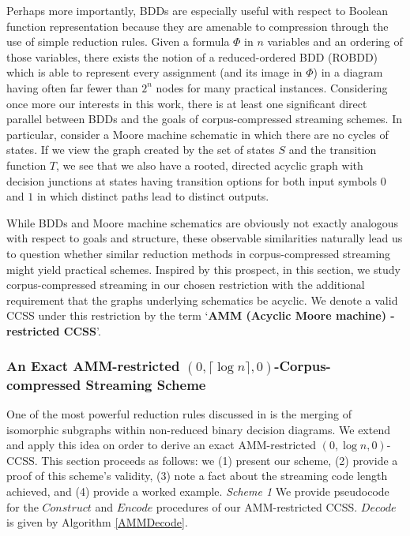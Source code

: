\documentclass{article}
\theoremstyle{definition}
\begin{document}
Perhaps more importantly, BDDs are especially useful with respect to Boolean function representation 
because they are amenable to compression through the use of simple reduction rules.  
Given a formula $\Phi$ in $n$ variables and an ordering of those variables, 
there exists the notion of a reduced-ordered BDD 
(ROBDD) which is able to represent every assignment (and its image in $\Phi$) in 
a diagram having often far fewer than $2^n$ nodes for many practical instances.
\newline\newline
Considering once more our interests in this work, there is at least one significant direct parallel between BDDs and the goals of
corpus-compressed streaming schemes.  In particular, consider a Moore machine schematic in which 
there are no cycles of states.  
If we view the graph created by the set of states $S$ and the transition function $T$, 
we see that we also have a rooted, directed acyclic graph with decision junctions at 
states having transition options for both input symbols $0$ and $1$ in which distinct 
paths lead to distinct outputs.

While BDDs and Moore machine schematics are obviously not exactly analogous with respect to 
goals and structure, these observable similarities naturally lead us to question whether 
similar reduction methods in corpus-compressed streaming might yield practical schemes.  
Inspired by this prospect, in this section, we study corpus-compressed streaming in 
our chosen restriction with the additional requirement that the graphs underlying schematics 
be acyclic.  We denote a valid CCSS under this restriction by the term `\textbf{AMM (Acyclic Moore machine)
-restricted CCSS}'.

\subsubsection{An Exact AMM-restricted $(0,\lceil \log n \rceil ,0)$-Corpus-compressed Streaming Scheme}

One of the most powerful reduction rules discussed in \cite{BDDs} is the merging of 
isomorphic subgraphs within non-reduced binary decision diagrams.
We extend and apply this idea on order to derive an exact AMM-restricted $(0, \log n, 0)$-CCSS.
This section proceeds as follows: we (1) present our scheme, (2) provide a proof of this scheme's 
validity, (3) note a fact about the streaming code length achieved, and
(4) provide a worked example.
\newline\newline
\noindent \textit{Scheme 1 } We provide pseudocode for the $Construct$ and $Encode$ procedures of our AMM-restricted CCSS. $Decode$ is given by Algorithm \ref{AMMDecode}.
\end{document}
